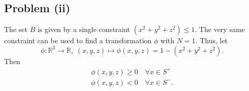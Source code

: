 \subsection*{Problem (ii)}

The set $B$ is given by a single constraint $\left(x^{2}+y^{2}+z^{2}\right)\leq1$.
The very same constraint can be used to find a transformation $\phi$
with $N=1$. Thus, let 
\[
\phi:\mathbb{R}^{3}\rightarrow\mathbb{R},\;(x,y,z)\mapsto\phi(x,y,z)=1-\left(x^{2}+y^{2}+z^{2}\right).
\]
Then
\[
\begin{gathered}\phi(x,y,z)\geq0\quad\forall x\in S^{+}\\
\phi(x,y,z)<0\quad\forall x\in S^{-}.
\end{gathered}
\]